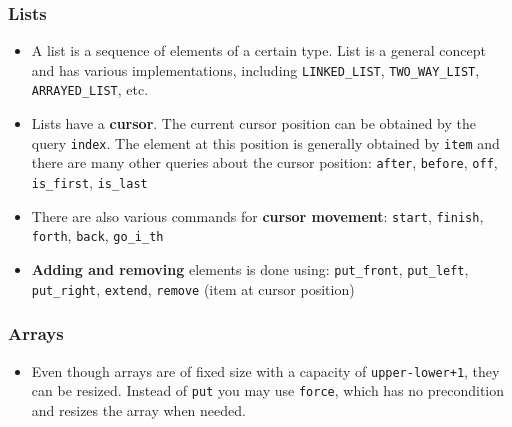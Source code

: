 \documentclass[a4paper]{article}
\newcommand{\inline}[1]{\lstinline!#1!}%
\begin{document}
\subsubsection{Lists}
\begin{itemize}
\item A list is a sequence of elements of a certain type. List is a general concept and has various implementations, including \inline{LINKED_LIST}, \inline{TWO_WAY_LIST}, \inline{ARRAYED_LIST}, etc.
\item Lists have a \textbf{cursor}. The current cursor position can be obtained by the query \inline{index}. The element at this position is generally obtained by \inline{item} and there are many other queries about the cursor position: \inline{after}, \inline{before}, \inline{off}, \inline{is_first}, \inline{is_last}
\item There are also various commands for \textbf{cursor movement}: \inline{start}, \inline{finish}, \inline{forth}, \inline{back}, \inline{go_i_th}
\item \textbf{Adding and removing} elements is done using: \inline{put_front}, \inline{put_left}, \inline{put_right}, \inline{extend}, \inline{remove} (item at cursor position)
\end{itemize}
\subsubsection{Arrays}
\begin{itemize}
\item Even though arrays are of fixed size with a capacity of \inline{upper-lower+1}, they can be resized. Instead of \inline{put} you may use \inline{force}, which has no precondition and resizes the array when needed.
\end{itemize}
\end{document}
